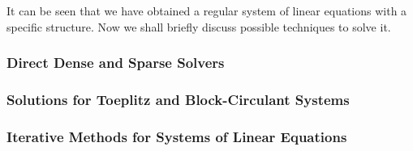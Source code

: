It can be seen that we have obtained a regular system of linear equations with a specific structure. Now we shall briefly discuss possible techniques to solve it.

\subsubsection{Direct Dense and Sparse Solvers}


\subsubsection{Solutions for Toeplitz and Block-Circulant Systems} \label{sec:fast-fourier-transform}


\subsubsection{Iterative Methods for Systems of Linear Equations}

